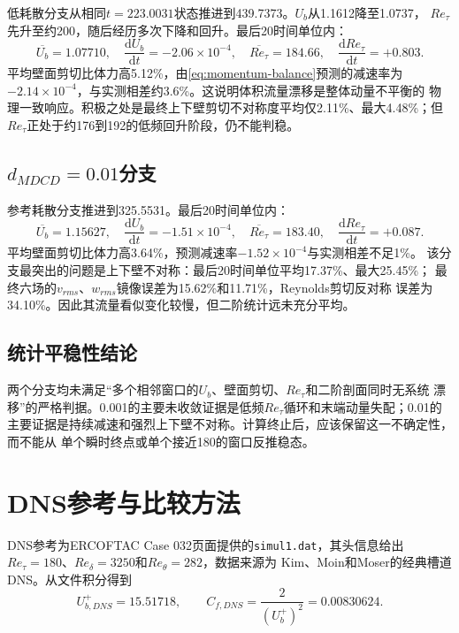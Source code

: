 \documentclass[UTF8,12pt,a4paper,fontset=fandol]{ctexart}
\newcommand{\Retau}{Re_{\tau}}
\newcommand{\Ub}{U_b}
\newcommand{\code}[1]{\texttt{#1}}
\begin{document}
低耗散分支从相同$t=223.0031$状态推进到439.7373。$\Ub$从1.1612降至1.0737，
$\Retau$先升至约200，随后经历多次下降和回升。最后20时间单位内：
\begin{equation}
  \overline{\Ub}=1.07710,\quad \frac{\mathrm d\Ub}{\mathrm dt}=-2.06\times10^{-4},
  \quad \overline{\Retau}=184.66,\quad
  \frac{\mathrm d\Retau}{\mathrm dt}=+0.803 .
\end{equation}
平均壁面剪切比体力高5.12\%，由\cref{eq:momentum-balance}预测的减速率为
$-2.14\times10^{-4}$，与实测相差约3.6\%。这说明体积流量漂移是整体动量不平衡的
物理一致响应。积极之处是最终上下壁剪切不对称度平均仅2.11\%、最大4.48\%；但
$\Retau$正处于约176到192的低频回升阶段，仍不能判稳。

\subsection{$d_{MDCD}=0.01$分支}

参考耗散分支推进到325.5531。最后20时间单位内：
\begin{equation}
  \overline{\Ub}=1.15627,\quad \frac{\mathrm d\Ub}{\mathrm dt}=-1.51\times10^{-4},
  \quad \overline{\Retau}=183.40,\quad
  \frac{\mathrm d\Retau}{\mathrm dt}=+0.087 .
\end{equation}
平均壁面剪切比体力高3.64\%，预测减速率$-1.52\times10^{-4}$与实测相差不足1\%。
该分支最突出的问题是上下壁不对称：最后20时间单位平均17.37\%、最大25.45\%；
最终六场的$v_{rms}$、$w_{rms}$镜像误差为15.62\%和11.71\%，Reynolds剪切反对称
误差为34.10\%。因此其流量看似变化较慢，但二阶统计远未充分平均。

\subsection{统计平稳性结论}

两个分支均未满足“多个相邻窗口的$\Ub$、壁面剪切、$\Retau$和二阶剖面同时无系统
漂移”的严格判据。0.001的主要未收敛证据是低频$\Retau$循环和末端动量失配；0.01的
主要证据是持续减速和强烈上下壁不对称。计算终止后，应该保留这一不确定性，而不能从
单个瞬时终点或单个接近180的窗口反推稳态。

\section{DNS参考与比较方法}

DNS参考为ERCOFTAC Case 032页面提供的\code{simul1.dat}，其头信息给出
$\Retau=180$、$Re_{\delta}=3250$和$Re_{\theta}=282$，数据来源为
Kim、Moin和Moser的经典槽道DNS\cite{kim1987}。从文件积分得到
\begin{equation}
  U_{b,DNS}^+=15.51718,\qquad C_{f,DNS}=\frac{2}{(U_b^+)^2}=0.00830624 .
\end{equation}
\end{document}
